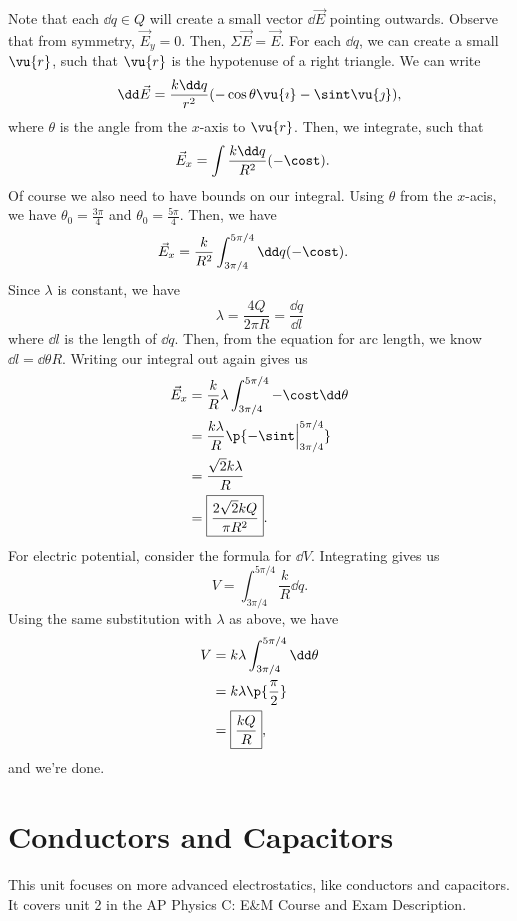 \documentclass[11pt]{article}
\begin{document}
\begin{solution}
    Note that each $\dd q \in Q$ will create a small vector $\dd\vec{E}$ pointing outwards. Observe that from symmetry, $\vec{E}_y = 0$. Then, $\Sigma \vec{E} = \vec{E}$. For each $\dd q$, we can create a small $\vu{r}$, such that $\vu{r}$ is the hypotenuse of a right triangle. We can write
    \[\dd\vec{E} = \frac{k\dd q}{r^2}(-\cos\theta \vu{\imath} - \sint\vu{\jmath}),\]
    where $\theta$ is the angle from the $x$-axis to $\vu{r}$. Then, we integrate, such that
    \begin{align*}
        \vec{E}_x &= \int \frac{k\dd q}{R^2}(-\cost).    
    \end{align*}
    Of course we also need to have bounds on our integral. Using $\theta$ from the $x$-acis, we have $\theta_0 = \frac{3\pi}{4}$ and $\theta_0 = \frac{5\pi}{4}$. Then, we have
    \begin{align*}
        \vec{E}_x &= \frac{k}{R^2} \int_{3\pi/4}^{5\pi/4} \dd q (-\cost).
    \end{align*}
    Since $\lambda$ is constant, we have
    \[\lambda = \frac{4Q}{2\pi R} = \frac{\dd q}{\dd l}\]
    where $\dd l$ is the length of $\dd q$. Then, from the equation for arc length, we know $\dd l = \dd\theta R$. Writing our integral out again gives us
    \begin{align*}
        \vec{E}_x &= \frac{k}{R}\lambda\int_{3\pi/4}^{5\pi/4} -\cost\dd \theta \\
        &= \frac{k\lambda}{R}\p{-\sint\Big|_{3\pi/4}^{5\pi/4}} \\
        &= \frac{\sqrt{2} k\lambda}{R} \\
        &= \boxed{\frac{2\sqrt{2}kQ}{\pi R^2}}.
    \end{align*}
    For electric potential, consider the formula for $\dd V$. Integrating gives us
    \[V = \int_{3\pi/4}^{5\pi/4} \frac{k}{R}\dd q.\]
    Using the same substitution with $\lambda$ as above, we have
    \begin{align*}
        V &= k\lambda\int_{3\pi/4}^{5\pi/4} \dd \theta \\
        &= k\lambda\p{\frac{\pi}{2}} \\
        &= \boxed{\frac{kQ}{R}},    
    \end{align*}
    and we're done.
\end{solution}

\newpage
\part{Conductors and Capacitors}
This unit focuses on more advanced electrostatics, like conductors and capacitors. It covers unit 2 in the AP Physics C: E\&M Course and Exam Description.
\end{document}
